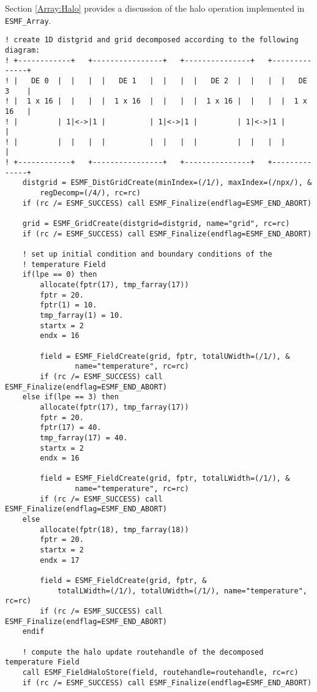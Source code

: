    Section \ref{Array:Halo} provides a discussion of the
   halo operation implemented in {\tt ESMF\_Array}.
   

 \begin{verbatim}
! create 1D distgrid and grid decomposed according to the following diagram:
! +------------+   +----------------+   +---------------+   +--------------+
! |   DE 0  |  |   |  |   DE 1   |  |   |  |   DE 2  |  |   |  |   DE 3    |
! |  1 x 16 |  |   |  |  1 x 16  |  |   |  |  1 x 16 |  |   |  |  1 x 16   |
! |         | 1|<->|1 |          | 1|<->|1 |         | 1|<->|1 |           |
! |         |  |   |  |          |  |   |  |         |  |   |  |           |
! +------------+   +----------------+   +---------------+   +--------------+
    distgrid = ESMF_DistGridCreate(minIndex=(/1/), maxIndex=(/npx/), &
        regDecomp=(/4/), rc=rc)
    if (rc /= ESMF_SUCCESS) call ESMF_Finalize(endflag=ESMF_END_ABORT)

    grid = ESMF_GridCreate(distgrid=distgrid, name="grid", rc=rc)
    if (rc /= ESMF_SUCCESS) call ESMF_Finalize(endflag=ESMF_END_ABORT)

    ! set up initial condition and boundary conditions of the
    ! temperature Field
    if(lpe == 0) then
        allocate(fptr(17), tmp_farray(17))
        fptr = 20.
        fptr(1) = 10.
        tmp_farray(1) = 10.
        startx = 2
        endx = 16

        field = ESMF_FieldCreate(grid, fptr, totalUWidth=(/1/), &
                name="temperature", rc=rc)
        if (rc /= ESMF_SUCCESS) call ESMF_Finalize(endflag=ESMF_END_ABORT)
    else if(lpe == 3) then
        allocate(fptr(17), tmp_farray(17))
        fptr = 20.
        fptr(17) = 40.
        tmp_farray(17) = 40.
        startx = 2
        endx = 16

        field = ESMF_FieldCreate(grid, fptr, totalLWidth=(/1/), &
                name="temperature", rc=rc)
        if (rc /= ESMF_SUCCESS) call ESMF_Finalize(endflag=ESMF_END_ABORT)
    else
        allocate(fptr(18), tmp_farray(18))
        fptr = 20.
        startx = 2
        endx = 17

        field = ESMF_FieldCreate(grid, fptr, &
            totalLWidth=(/1/), totalUWidth=(/1/), name="temperature", rc=rc)
        if (rc /= ESMF_SUCCESS) call ESMF_Finalize(endflag=ESMF_END_ABORT)
    endif

    ! compute the halo update routehandle of the decomposed temperature Field
    call ESMF_FieldHaloStore(field, routehandle=routehandle, rc=rc)
    if (rc /= ESMF_SUCCESS) call ESMF_Finalize(endflag=ESMF_END_ABORT)


\end{verbatim}
